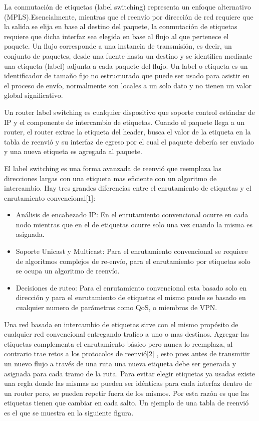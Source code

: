 \documentclass[10pt,journal,compsoc]{IEEEtran}
\begin{document}
La conmutación de etiquetas (label switching) representa un enfoque alternativo (MPLS).Esencialmente, mientras que el reenvío por dirección de red requiere que la salida se elija en base al destino del paquete, la conmutación de etiquetas requiere que dicha interfaz sea elegida en base al flujo al que pertenece el paquete. Un flujo corresponde a una instancia de transmisión, es decir, un conjunto de paquetes, desde una fuente hasta un destino y se identifica mediante una etiqueta (label) adjunta a cada paquete del flujo. Un label o etiqueta es un identificador de tamaño fijo no estructurado que puede ser usado para asistir en el proceso de envío, normalmente son locales a un solo dato y no tienen un valor global significativo.

Un router label switching es cualquier dispositivo que soporte control estándar de IP y el componente de intercambio de etiquetas.  Cuando el paquete llega a un router, el router extrae la etiqueta del header, busca el valor de la etiqueta en la tabla de reenvió y su interfaz de egreso por el cual el paquete debería ser enviado y una nueva etiqueta es agregada al paquete. 

El label switching es una forma avanzada de reenvió que reemplaza las direcciones largas con una etiqueta mas eficiente con un algoritmo de intercambio. Hay tres grandes diferencias entre el enrutamiento de etiquetas y el enrutamiento convencional[1]:

\begin{itemize}
  \item Análisis de encabezado IP: En el enrutamiento convencional ocurre en cada nodo mientras que en el de etiquetas ocurre solo una vez cuando la misma es asignada. 
  \item Soporte Unicast y Multicast: Para el enrutamiento convencional se requiere de algoritmos complejos de re-envío, para el enrutamiento por etiquetas solo se ocupa un algoritmo de reenvío.
  \item Decisiones de ruteo: Para el enrutamiento convencional esta basado solo en dirección y para el enrutamiento de etiquetas el mismo puede se basado en cualquier numero de parámetros como QoS, o miembros de VPN.
\end{itemize}



Una red basada en intercambio de etiquetas sirve con el mismo propósito de cualquier red convencional entregando trafico a uno o mas destinos. Agregar las etiquetas complementa el enrutamiento básico pero nunca lo reemplaza, al contrario trae retos a los protocolos de reenvió[2] , esto pues antes de transmitir un nuevo flujo a través de una ruta una nueva etiqueta debe ser generada y asignada para cada tramo de la ruta. Para evitar elegir etiquetas ya usadas existe una regla donde las mismas no pueden ser idénticas para cada interfaz dentro de un router pero, se pueden repetir fuera de los mismos. Por esta razón es que las etiquetas tienen que cambiar en cada salto. Un ejemplo de una tabla de reenvió es el que se muestra en la siguiente figura.
\end{document}
